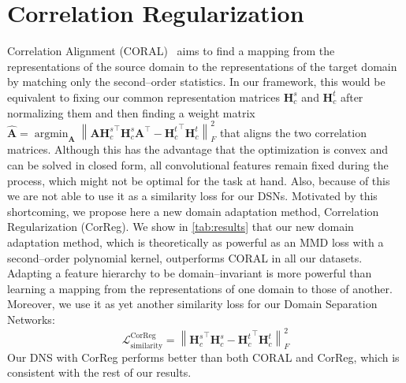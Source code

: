\documentclass{article}
\newcommand{\bs}[1]{\boldsymbol{\mathbf{#1}}}
\DeclareMathOperator*{\argmin}{argmin}
\begin{document}
\section{Correlation Regularization}
\label{sec:correg}

Correlation Alignment (CORAL)~\cite{sun2015return} aims to find a mapping from the representations of the source domain to the representations of the target domain by matching only the second--order statistics. In our framework, this would be equivalent to fixing our common representation  matrices $\bs H_c^s$ and $\bs H_c^t$ after normalizing them and then finding a weight matrix $ \hat{\bs A} = \displaystyle {\argmin_{\bs A}}\left\| \bs A{\bs H_c^s}^\top {\bs H_c^s}\bs A^\top - {\bs H_c^t}^\top {\bs H_c^t} \right\|_F^2$ that aligns the two correlation matrices. Although this has the advantage that the optimization
is convex and can be solved in closed form, all convolutional features remain
fixed during the process, which might not be optimal for the task at hand. Also, because of this we are not able to use it as a similarity loss for our DSNs. 
Motivated by this shortcoming, we propose here a new domain adaptation method, Correlation Regularization (CorReg). We show in \autoref{tab:results} that our new domain adaptation method, which is theoretically as powerful as an MMD loss with a second--order polynomial kernel, outperforms CORAL in all our datasets. Adapting a feature hierarchy to be domain--invariant is more powerful than learning a mapping from the representations of one domain to those of another. Moreover, we use it as yet another similarity loss for our Domain Separation Networks:
\begin{equation}
\mathcal{L}_\mathrm{similarity}^\mathrm{CorReg} = \left\| {\bs H_c^s}^\top {\bs H_c^s} - {\bs H_c^t}^\top {\bs H_c^t} \right\|_F^2
\end{equation}
Our DNS with CorReg performs better than both CORAL and CorReg, which is consistent with the rest of our results.
\end{document}
